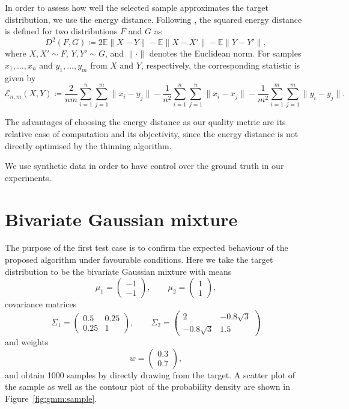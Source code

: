 \documentclass[11pt,a4paper]{report}
\begin{document}
In order to assess how well the selected sample approximates the target distribution, we use the energy distance. Following \cite{rizzoEnergyDistance2016}, the squared energy distance is defined for two distributions $F$ and $G$ as
$$D^2(F, G) \coloneq 2 \mathbb{E} \|X - Y\| - \mathbb{E}\|X - X'\| - \mathbb{E} \|Y - Y'\|,$$
where $X, X' \sim F$, $Y, Y' \sim G$, and $\|\cdot\|$ denotes the Euclidean norm. For samples $x_1, \dots, x_n$ and $y_1, \dots, y_m$ from $X$ and $Y$, respectively, the corresponding statistic is given by
\begin{equation*}
\mathcal{E}_{n,m}(X, Y) \coloneq \frac{2}{nm}\sum_{i=1}^n \sum_{j=1}^m \|x_i - y_j\| - \frac{1}{n^2} \sum_{i=1}^n\sum_{j=1}^n \|x_i - x_j\| - \frac{1}{m^2} \sum_{i=1}^m \sum_{j=1}^m \|y_i - y_j\|.
\label{eq:energy-distance:discrete}
\end{equation*}

The advantages of choosing the energy distance as our quality metric are its relative ease of computation and its objectivity, since the energy distance is not directly optimised by the thinning algorithm.

We use synthetic data in order to have control over the ground truth in our experiments.

\section{Bivariate Gaussian mixture}
\label{sec:gaussian-mixture}

The purpose of the first test case is to confirm the expected behaviour of the proposed algorithm under favourable conditions. Here we take the target distribution to be the bivariate Gaussian mixture with means 
$$
\mu_1 = \begin{pmatrix} -1 \\ -1 \end{pmatrix}, \qquad
\mu_2 = \begin{pmatrix} 1 \\ 1 \end{pmatrix},
$$
covariance matrices
$$
\Sigma_1 = \begin{pmatrix}
0.5 & 0.25\\
0.25 & 1
\end{pmatrix}, \qquad
\Sigma_2 = \begin{pmatrix}
2 & -0.8 \sqrt{3}\\
-0.8 \sqrt{3} & 1.5
\end{pmatrix}
$$
and weights
$$w = \begin{pmatrix} 0.3 \\ 0.7 \end{pmatrix},$$
and obtain 1000 samples by directly drawing from the target. A scatter plot of the sample as well as the contour plot of the probability density are shown in Figure~\ref{fig:gmm:sample}.
\end{document}
